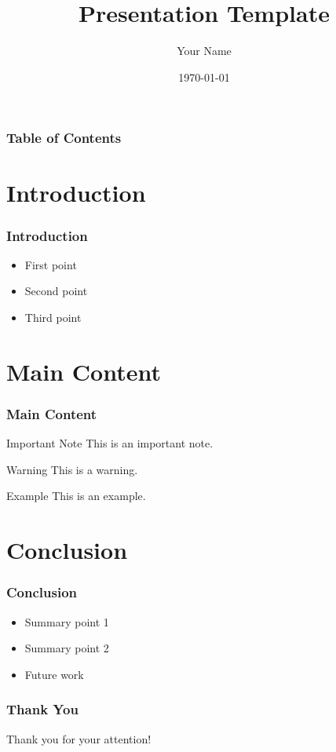 \documentclass{beamer}
\title{Presentation Template}
\author{Your Name}
\institute{Your Institution}
\date{\today}
\begin{document}
\frame{\titlepage}

\begin{frame}
\frametitle{Table of Contents}
\tableofcontents
\end{frame}

\section{Introduction}

\begin{frame}
\frametitle{Introduction}
\begin{itemize}
    \item First point
    \item Second point
    \item Third point
\end{itemize}
\end{frame}

\section{Main Content}

\begin{frame}
\frametitle{Main Content}
\begin{block}{Important Note}
This is an important note.
\end{block}

\begin{alertblock}{Warning}
This is a warning.
\end{alertblock}

\begin{exampleblock}{Example}
This is an example.
\end{exampleblock}
\end{frame}

\section{Conclusion}

\begin{frame}
\frametitle{Conclusion}
\begin{itemize}
    \item Summary point 1
    \item Summary point 2
    \item Future work
\end{itemize}
\end{frame}

\begin{frame}
\frametitle{Thank You}
\centering
\Large Thank you for your attention!
\end{frame}
\end{document}
